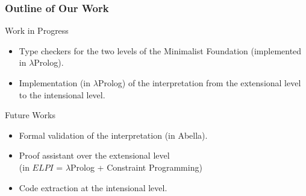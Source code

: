 \documentclass{beamer}
\begin{document}
%

\begin{frame}
\frametitle{Outline of Our Work}
\begin{block}{Work in Progress}
	\begin{itemize}
	\item	Type checkers for the two levels of the Minimalist Foundation 
			(implemented in $\lambda$Prolog).
	\item 	Implementation (in $\lambda$Prolog) of the interpretation from 
			the extensional level to the intensional level.
	\end{itemize}
\end{block}
\begin{block}{Future Works}
	\begin{itemize}
                \item   Formal validation of the interpretation (in Abella).
		\item	Proof assistant over the extensional level\\
                 (in $ELPI$ = $\lambda$Prolog + Constraint Programming)
		\item 	Code extraction at the intensional level.
	\end{itemize}
\end{block}

	\note[item]{ }



\end{frame}
\end{document}
